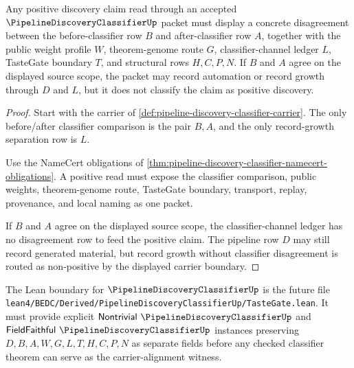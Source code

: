 \begin{theorem}
\label{thm:pipeline-discovery-classifier-positive-claim-gate}
Any positive discovery claim read through an accepted $\PipelineDiscoveryClassifierUp$ packet must display a concrete disagreement between the before-classifier row $B$ and after-classifier row $A$, together with the public weight profile $W$, theorem-genome route $G$, classifier-channel ledger $L$, TasteGate boundary $T$, and structural rows $H,C,P,N$. If $B$ and $A$ agree on the displayed source scope, the packet may record automation or record growth through $D$ and $L$, but it does not classify the claim as positive discovery.
\end{theorem}
\begin{proof}
Start with the carrier of \autoref{def:pipeline-discovery-classifier-carrier}. The only before/after classifier comparison is the pair $B,A$, and the only record-growth separation row is $L$.

Use the NameCert obligations of \autoref{thm:pipeline-discovery-classifier-namecert-obligations}. A positive read must expose the classifier comparison, public weights, theorem-genome route, TasteGate boundary, transport, replay, provenance, and local naming as one packet.

If $B$ and $A$ agree on the displayed source scope, the classifier-channel ledger has no disagreement row to feed the positive claim. The pipeline row $D$ may still record generated material, but record growth without classifier disagreement is routed as non-positive by the displayed carrier boundary.
\end{proof}



The Lean boundary for $\PipelineDiscoveryClassifierUp$ is the future file \texttt{lean4/BEDC/Derived/PipelineDiscoveryClassifierUp/TasteGate.lean}. It must provide explicit $\mathsf{Nontrivial}\ \PipelineDiscoveryClassifierUp$ and $\mathsf{FieldFaithful}\ \PipelineDiscoveryClassifierUp$ instances preserving $D,B,A,W,G,L,T,H,C,P,N$ as separate fields before any checked classifier theorem can serve as the carrier-alignment witness.


